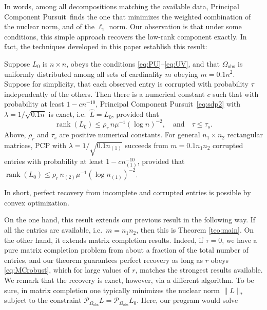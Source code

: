 In words, among all decompositions matching the available data, Principal Component Pursuit\, finds the one that minimizes the weighted combination of the nuclear norm, and of the $\ell_1$ norm. Our observation is that under some conditions, this simple approach recovers the low-rank component exactly. In fact, the techniques developed in this paper establish this result:

\begin{theorem}
\label{teo:MCRobust}
Suppose $L_0$ is $n \times n$, obeys the conditions
\eqref{eq:PU}--\eqref{eq:UV}, and that $\Omega_{\text{obs}}$ is uniformly distributed among all sets of cardinality $m$ obeying $m = 0.1 n^2$.  Suppose for simplicity, that each observed entry is corrupted with probability
$\tau$ independently of the others.  Then there is a numerical constant $c$ such that with probability at least $1 - c n^{-10}$, Principal Component Pursuit\, \eqref{eq:sdp2} with $\lambda = 1/\sqrt{0.1 n}$ is exact, i.e.~$\hat L = L_0$, provided that
\begin{equation}
  \label{eq:MCrobust}
  \operatorname{rank}(L_0) \le \rho_r  \, n 
  \mu^{-1} (\log n)^{-2}, \quad \text{and} \quad   
  \tau \le \tau_s. 
\end{equation}
Above, $\rho_r$ and $\tau_s$ are positive numerical constants. For general $n_1 \times n_2$ rectangular matrices, PCP with $\lambda =
1/\sqrt{0.1 n_{(1)}}$ succeeds from $m = 0.1 n_1 n_2$ corrupted entries with probability at least $1 - c n_{(1)}^{-10}$, provided that $\operatorname{rank}(L_0) \le \rho_r \, n_{(2)} \mu^{-1} (\log n_{(1)})^{-2}$.
\end{theorem}

In short, perfect recovery from incomplete and corrupted entries is possible by convex optimization.

On the one hand, this result extends our previous result in the following way. If all the entries are available, i.e.~$m = n_1 n_2$, then this is Theorem \ref{teo:main}. On the other hand, it extends matrix completion results. Indeed, if $\tau = 0$, we have a pure matrix completion problem from about a fraction of the total number of entries, and our theorem guarantees perfect recovery as long as $r$ obeys \eqref{eq:MCrobust}, which for large values of $r$, matches the strongest results available. We remark that the recovery is exact, however, via a different algorithm. To be sure, in matrix completion one typically minimizes the nuclear norm $\|L\|_*$ subject to the constraint $\mathcal{P}_{\Omega_{\text{obs}}} L = \mathcal{P}_{\Omega_{\text{obs}}} L_0$. Here, our program would solve

